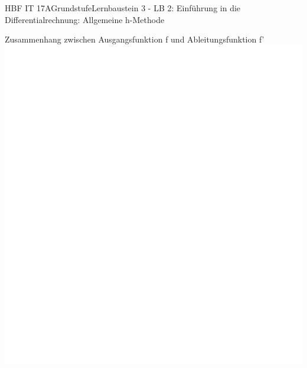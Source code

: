 \documentclass[oneside,openany,headings=optiontotoc,11pt,numbers=noenddot]{scrreprt}
\begin{document}
\begin{worksheet}{HBF IT 17A}{Grundstufe}{Lernbaustein 3 - LB 2: Einführung in die Differentialrechnung: Allgemeine h-Methode}
		\begin{framed}
			\noindent
			\tiny{\color{codegray}Zusammenhang zwischen Ausgangsfunktion f und Ableitungsfunktion f'}\\
			\includegraphics[scale=0.39]{../empty.jpg}
		\end{framed}
	\end{worksheet}
\end{document}
